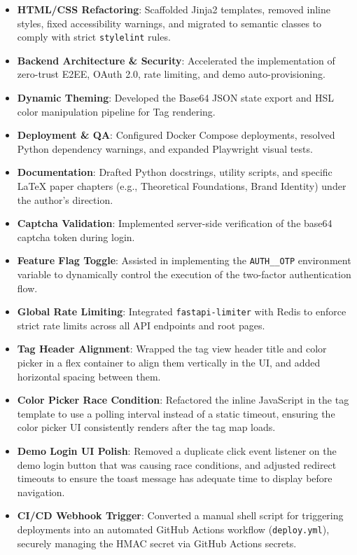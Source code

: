 \documentclass[11pt,a4paper]{book}
\begin{document}
\begin{itemize}
  \item \textbf{HTML/CSS Refactoring}: Scaffolded Jinja2 templates, removed inline styles, fixed accessibility warnings, and migrated to semantic classes to comply with strict \texttt{stylelint} rules.
  \item \textbf{Backend Architecture \& Security}: Accelerated the implementation of zero-trust E2EE, OAuth 2.0, rate limiting, and demo auto-provisioning.
  \item \textbf{Dynamic Theming}: Developed the Base64 JSON state export and HSL color manipulation pipeline for Tag rendering.
  \item \textbf{Deployment \& QA}: Configured Docker Compose deployments, resolved Python dependency warnings, and expanded Playwright visual tests.
  \item \textbf{Documentation}: Drafted Python docstrings, utility scripts, and specific {\LatinModernRoman \LaTeX} paper chapters (e.g., Theoretical Foundations, Brand Identity) under the author's direction.
  \item \textbf{Captcha Validation}: Implemented server-side verification of the base64 captcha token during login.
  \item \textbf{Feature Flag Toggle}: Assisted in implementing the \texttt{AUTH\_\_OTP} environment variable to dynamically control the execution of the two-factor authentication flow.
  \item \textbf{Global Rate Limiting}: Integrated \texttt{fastapi-limiter} with Redis to enforce strict rate limits across all API endpoints and root pages.
  \item \textbf{Tag Header Alignment}: Wrapped the tag view header title and color picker in a flex container to align them vertically in the UI, and added horizontal spacing between them.
  \item \textbf{Color Picker Race Condition}: Refactored the inline JavaScript in the tag template to use a polling interval instead of a static timeout, ensuring the color picker UI consistently renders after the tag map loads.
  \item \textbf{Demo Login UI Polish}: Removed a duplicate click event listener on the demo login button that was causing race conditions, and adjusted redirect timeouts to ensure the toast message has adequate time to display before navigation.
  \item \textbf{CI/CD Webhook Trigger}: Converted a manual shell script for triggering deployments into an automated GitHub Actions workflow (\texttt{deploy.yml}), securely managing the HMAC secret via GitHub Actions secrets.

\end{itemize}
\end{document}
